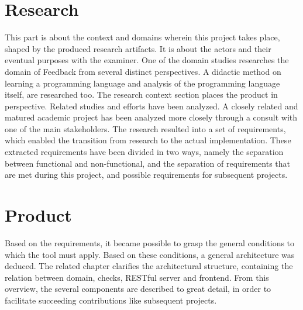 \section{Research}
This part is about the context and domains wherein this project takes place, 
shaped by the produced research artifacts.
It is about the actors and their eventual purposes with the \gls{examiner}. One
of the domain studies researches the domain of Feedback from several distinct
perspectives. A didactic method on learning a programming language and
analysis of the programming language itself, are researched too. The research 
context section places the product in perspective. Related studies and efforts have been analyzed. A closely related and matured academic project has been analyzed more closely through a consult with one of the main stakeholders.
The research resulted into a set of requirements, which enabled the transition
from research to the actual implementation. These extracted requirements have
been divided in two ways, namely the separation between functional and 
non-functional, and the separation of requirements that are met during this
project, and possible requirements for subsequent projects.

\section{Product}
Based on the requirements, it became possible to grasp the general conditions 
to which the tool must apply. Based on these conditions, a general architecture
was deduced. The related chapter clarifies the architectural structure, 
containing the relation between domain, \glspl{check}, RESTful server and frontend.
From this overview, the several components are described to great detail, in
order to facilitate succeeding contributions like subsequent projects.


